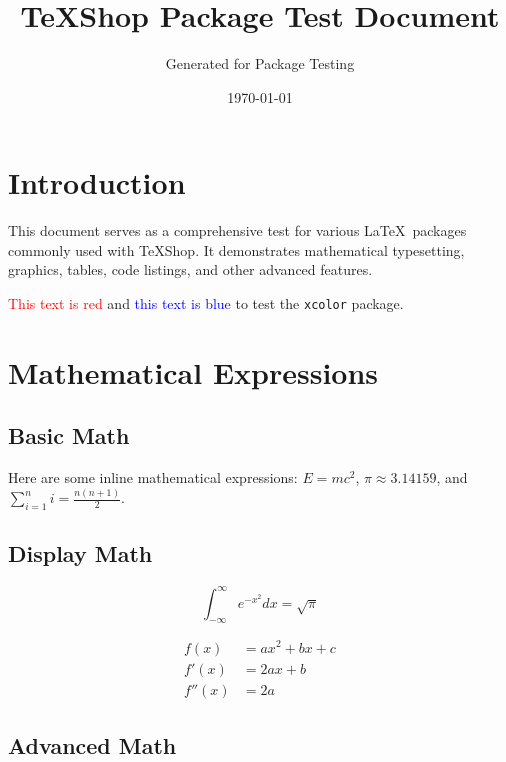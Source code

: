 \documentclass[12pt,a4paper]{article}
\title{\textbf{TeXShop Package Test Document}}
\author{Generated for Package Testing}
\date{\today}
\begin{document}
\maketitle

\tableofcontents
\newpage

\section{Introduction}

This document serves as a comprehensive test for various \LaTeX\ packages commonly used with TeXShop. It demonstrates mathematical typesetting, graphics, tables, code listings, and other advanced features.

\textcolor{red}{This text is red} and \textcolor{blue}{this text is blue} to test the \texttt{xcolor} package.

\section{Mathematical Expressions}

\subsection{Basic Math}

Here are some inline mathematical expressions: $E = mc^2$, $\pi \approx 3.14159$, and $\sum_{i=1}^{n} i = \frac{n(n+1)}{2}$.

\subsection{Display Math}

\begin{equation}
\int_{-\infty}^{\infty} e^{-x^2} dx = \sqrt{\pi}
\end{equation}

\begin{align}
f(x) &= ax^2 + bx + c \\
f'(x) &= 2ax + b \\
f''(x) &= 2a
\end{align}

\subsection{Advanced Math}
\end{document}
